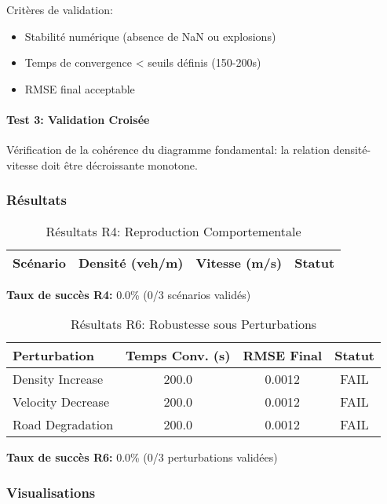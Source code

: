 Critères de validation:
\begin{itemize}
    \item Stabilité numérique (absence de NaN ou explosions)
    \item Temps de convergence < seuils définis (150-200s)
    \item RMSE final acceptable
\end{itemize}

\paragraph{Test 3: Validation Croisée}
Vérification de la cohérence du diagramme fondamental: la relation densité-vitesse doit être décroissante monotone.

\subsubsection{Résultats}


\begin{table}[htbp]
\centering
\caption{Résultats R4: Reproduction Comportementale}
\begin{tabular}{lccc}
\toprule
\textbf{Scénario} & \textbf{Densité (veh/m)} & \textbf{Vitesse (m/s)} & \textbf{Statut} \\
\midrule
\bottomrule
\end{tabular}
\end{table}


\textbf{Taux de succès R4:} 0.0\% (0/3 scénarios validés)


\begin{table}[htbp]
\centering
\caption{Résultats R6: Robustesse sous Perturbations}
\begin{tabular}{lccc}
\toprule
\textbf{Perturbation} & \textbf{Temps Conv. (s)} & \textbf{RMSE Final} & \textbf{Statut} \\
\midrule
Density Increase & 200.0 & 0.0012 & FAIL \\
Velocity Decrease & 200.0 & 0.0012 & FAIL \\
Road Degradation & 200.0 & 0.0012 & FAIL \\
\bottomrule
\end{tabular}
\end{table}


\textbf{Taux de succès R6:} 0.0\% (0/3 perturbations validées)


\subsubsection{Visualisations}

